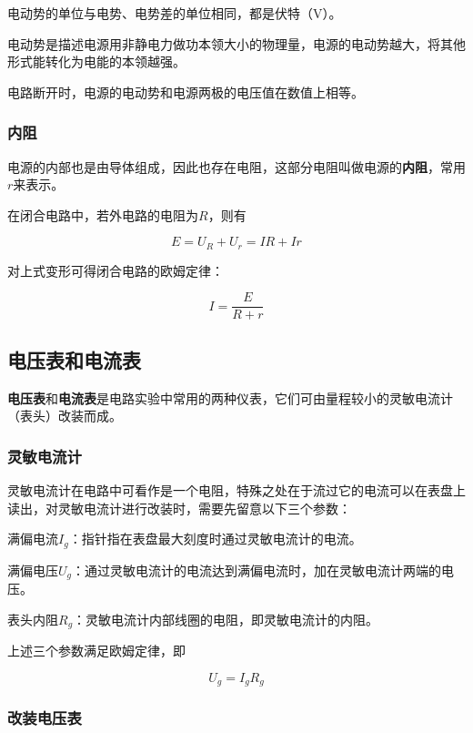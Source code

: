 电动势的单位与电势、电势差的单位相同，都是伏特（$\mathrm{V}$）。

电动势是描述电源用非静电力做功本领大小的物理量，电源的电动势越大，将其他形式能转化为电能的本领越强。

电路断开时，电源的电动势和电源两极的电压值在数值上相等。

\subsubsection{内阻}

电源的内部也是由导体组成，因此也存在电阻，这部分电阻叫做电源的\textbf{内阻}，常用$r$来表示。

在闭合电路中，若外电路的电阻为$R$，则有

\begin{equation}
E=U_R+U_r=IR+Ir
\end{equation}

对上式变形可得闭合电路的欧姆定律：

\begin{equation}
I=\frac{E}{R+r}
\end{equation}

\subsection{电压表和电流表}


\textbf{电压表}和\textbf{电流表}是电路实验中常用的两种仪表，它们可由量程较小的灵敏电流计（表头）改装而成。

\subsubsection{灵敏电流计}

灵敏电流计在电路中可看作是一个电阻，特殊之处在于流过它的电流可以在表盘上读出，对灵敏电流计进行改装时，需要先留意以下三个参数：

满偏电流$I_g$：指针指在表盘最大刻度时通过灵敏电流计的电流。

满偏电压$U_g$：通过灵敏电流计的电流达到满偏电流时，加在灵敏电流计两端的电压。

表头内阻$R_g$：灵敏电流计内部线圈的电阻，即灵敏电流计的内阻。

上述三个参数满足欧姆定律，即

\begin{equation}
U_g=I_g R_g
\end{equation}

\subsubsection{改装电压表}

